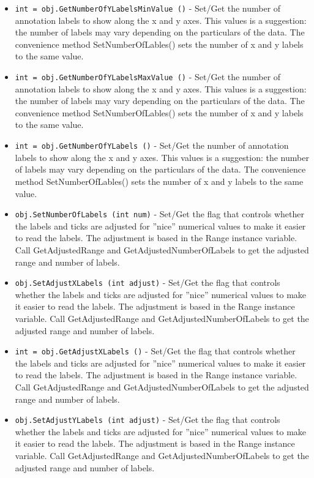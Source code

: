 \begin{itemize}
\item  \verb|int = obj.GetNumberOfYLabelsMinValue ()| -  Set/Get the number of annotation labels to show along the x and y axes.
 This values is a suggestion: the number of labels may vary depending
 on the particulars of the data. The convenience method 
 SetNumberOfLables() sets the number of x and y labels to the same value.

\item  \verb|int = obj.GetNumberOfYLabelsMaxValue ()| -  Set/Get the number of annotation labels to show along the x and y axes.
 This values is a suggestion: the number of labels may vary depending
 on the particulars of the data. The convenience method 
 SetNumberOfLables() sets the number of x and y labels to the same value.

\item  \verb|int = obj.GetNumberOfYLabels ()| -  Set/Get the number of annotation labels to show along the x and y axes.
 This values is a suggestion: the number of labels may vary depending
 on the particulars of the data. The convenience method 
 SetNumberOfLables() sets the number of x and y labels to the same value.

\item  \verb|obj.SetNumberOfLabels (int num)| -  Set/Get the flag that controls whether the labels and ticks are
 adjusted for ''nice'' numerical values to make it easier to read 
 the labels. The adjustment is based in the Range instance variable.
 Call GetAdjustedRange and GetAdjustedNumberOfLabels to get the adjusted
 range and number of labels.

\item  \verb|obj.SetAdjustXLabels (int adjust)| -  Set/Get the flag that controls whether the labels and ticks are
 adjusted for ''nice'' numerical values to make it easier to read 
 the labels. The adjustment is based in the Range instance variable.
 Call GetAdjustedRange and GetAdjustedNumberOfLabels to get the adjusted
 range and number of labels.

\item  \verb|int = obj.GetAdjustXLabels ()| -  Set/Get the flag that controls whether the labels and ticks are
 adjusted for ''nice'' numerical values to make it easier to read 
 the labels. The adjustment is based in the Range instance variable.
 Call GetAdjustedRange and GetAdjustedNumberOfLabels to get the adjusted
 range and number of labels.

\item  \verb|obj.SetAdjustYLabels (int adjust)| -  Set/Get the flag that controls whether the labels and ticks are
 adjusted for ''nice'' numerical values to make it easier to read 
 the labels. The adjustment is based in the Range instance variable.
 Call GetAdjustedRange and GetAdjustedNumberOfLabels to get the adjusted
 range and number of labels.


\end{itemize}
